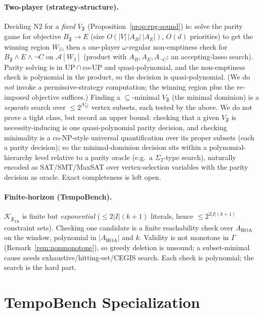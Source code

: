 \documentclass[11pt]{article}
\theoremstyle{remark}
\newcommand{\Frame}{\mathfrak{F}}
\begin{document}
\paragraph{Two-player (strategy-structure).} Deciding N2 for a \emph{fixed}
\(V_{\Frame}\) (Proposition~\ref{prop:rpg-sound}) is: solve the parity game for
objective \(B_{\Frame}\rightarrow E\) (size \(O(|V|\,|A_B|\,|A_E|)\), \(O(d)\)
priorities) to get the winning region \(W_\exists\), then a one-player
\(\omega\)-regular non-emptiness check for \(B_{\Frame}\wedge E\wedge\neg C\) on
\(\mathcal{A}[W_\exists]\) (product with \(A_B,A_E,A_{\neg C}\); an accepting-lasso
search). Parity solving is in \(\mathrm{UP}\cap\mathrm{co\text{-}UP}\) and
quasi-polynomial, and the non-emptiness check is polynomial in the product, so the
decision is quasi-polynomial. (We do \emph{not} invoke a permissive-strategy
computation; the winning region plus the re-imposed objective suffices.) Finding a
\(\subseteq\)-minimal \(V_{\Frame}\) (the minimal dominion) is a \emph{separate}
search over \(\le 2^{|V_0|}\) vertex subsets, each tested by the above. We do not
prove a tight class, but record an upper bound: checking that a given
\(V_{\Frame}\) is necessity-inducing is one quasi-polynomial parity decision, and
checking minimality is a co-\(\mathrm{NP}\)-style universal quantification over
its proper subsets (each a parity decision); so the minimal-dominion decision sits
within a polynomial-hierarchy level relative to a parity oracle (e.g.\ a
\(\Sigma_2\)-type search), naturally encoded as SAT/SMT/MaxSAT over
vertex-selection variables with the parity decision as oracle. Exact completeness
is left open.

\paragraph{Finite-horizon (TempoBench).} \(\mathcal{K}_{\Frame_{\mathrm{TB}}}\) is
finite but \emph{exponential} (\(\le 2|I|(k+1)\) literals, hence
\(\le 2^{2|I|(k+1)}\) constraint sets). Checking one candidate is a finite
reachability check over \(A_{\mathrm{HOA}}\) on the window, polynomial in
\(|A_{\mathrm{HOA}}|\) and \(k\). Validity is not monotone in \(\Gamma\)
(Remark~\ref{rem:nonmonotone}), so greedy deletion is unsound; a subset-minimal
cause needs exhaustive/hitting-set/CEGIS search. Each check is polynomial; the
search is the hard part.

\section{TempoBench Specialization}
\label{sec:tempobench}
\end{document}

